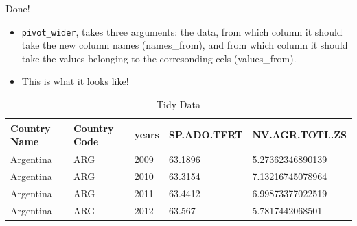 \documentclass[10pt,ignorenonframetext,]{beamer}
\begin{document}
\begin{frame}[fragile]{Done!}
\protect\hypertarget{done}{}

\begin{itemize}
\item
  \texttt{pivot\_wider}, takes three arguments: the data, from which
  column it should take the new column names (names\_from), and from
  which column it should take the values belonging to the corresonding
  cels (values\_from).
\item
  This is what it looks like!
\end{itemize}

\begin{table}

\caption{\label{tab:unnamed-chunk-13}Tidy Data}
\centering
\begin{tabular}[t]{lllll}
\toprule
Country Name & Country Code & years & SP.ADO.TFRT & NV.AGR.TOTL.ZS\\
\midrule
\rowcolor{gray!6}  Argentina & ARG & 2009 & 63.1896 & 5.27362346890139\\
Argentina & ARG & 2010 & 63.3154 & 7.13216745078964\\
\rowcolor{gray!6}  Argentina & ARG & 2011 & 63.4412 & 6.99873377022519\\
Argentina & ARG & 2012 & 63.567 & 5.7817442068501\\
\bottomrule
\end{tabular}
\end{table}

\end{frame}
\end{document}
